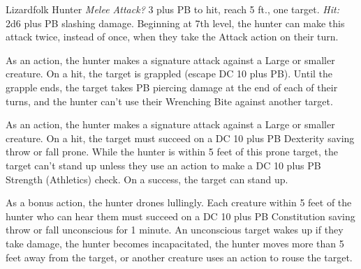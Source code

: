 \documentclass[10pt,a4paper,twoside,bg=print,twocolumn,openany,nodeprecatedcode]{dndbook}
\begin{document}
\begin{DndMonster}[float=t]{Lizardfolk Hunter}
\DndMonsterBasics[
armor-class = {15 (medium armor)},
hit-points = {\DndDice{Eight times their level (number of d10 Hit Dice equal to their level)}},
speed = {30 ft., swim 30 ft.}
]
\DndMonsterAbilityScores[
 str = 16,
 dex = 10,
 con = 10,
 int = 10,
 wis = 14,
 cha = 10
]
\DndMonsterDetails[
saving-throws = {Str +PB, Dex +PB, Con +PB, Int +PB, Wis +PB, Cha +PB},
skills = {Athletics +3 plus PB, Nature +0 plus PB, Perception +2 plus PB},
languages = {Common, Draconic},
]
\textsl{Melee Attack?} 3 plus PB to hit, reach 5 ft., one target. \textsl{Hit:} 2d6 plus PB slashing damage. Beginning at 7th level, the hunter can make this attack twice, instead of once, when they take the Attack action on their turn.

As an action, the hunter makes a signature attack against a Large or smaller creature. On a hit, the target is grappled (escape DC 10 plus PB). Until the grapple ends, the target takes PB piercing damage at the end of each of their turns, and the hunter can't use their Wrenching Bite against another target.

As an action, the hunter makes a signature attack against a Large or smaller creature. On a hit, the target must succeed on a DC 10 plus PB Dexterity saving throw or fall prone. While the hunter is within 5 feet of this prone target, the target can't stand up unless they use an action to make a DC 10 plus PB Strength (Athletics) check. On a success, the target can stand up.

As a bonus action, the hunter drones lullingly. Each creature within 5 feet of the hunter who can hear them must succeed on a DC 10 plus PB Constitution saving throw or fall unconscious for 1 minute. An unconscious target wakes up if they take damage, the hunter becomes incapacitated, the hunter moves more than 5 feet away from the target, or another creature uses an action to rouse the target.

\end{DndMonster}
\end{document}
